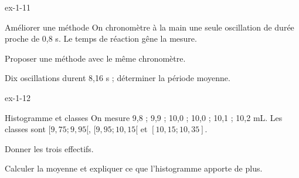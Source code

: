 \begin{blocLivre}{ex-1-11}\begin{exercice}[3]{Améliorer une méthode}
On chronomètre à la main une seule oscillation de durée proche de 0,8 s. Le temps de réaction gêne la mesure.
\begin{questions}
\item Proposer une méthode avec le même chronomètre.
\item Dix oscillations durent 8,16 s ; déterminer la période moyenne.
\end{questions}
\end{exercice}\end{blocLivre}
\begin{blocLivre}{ex-1-12}\begin{exercice}[3]{Histogramme et classes}
On mesure 9,8 ; 9,9 ; 10,0 ; 10,0 ; 10,1 ; 10,2 mL. Les classes sont $[9,75;9,95[$, $[9,95;10,15[$ et $[10,15;10,35]$.
\begin{questions}
\item Donner les trois effectifs.
\item Calculer la moyenne et expliquer ce que l’histogramme apporte de plus.
\end{questions}
\end{exercice}\end{blocLivre}

